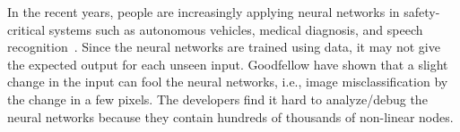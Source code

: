 









In the recent years,
people are  increasingly applying
neural networks in
safety-critical systems such as
autonomous vehicles,
medical diagnosis, and
speech recognition~\cite{bojarski2016end,amato2013artificial,hinton2012deep}.
%
%
Since the neural networks are trained using data, it may not give the expected output for each unseen input.
% 
Goodfellow \cite{goodfellow2014explaining} have shown that a slight change in the input can fool the neural networks,
i.e., image misclassification by the change in a few pixels.
%
The developers find it hard to analyze/debug the neural networks because they contain hundreds of thousands of non-linear nodes.



